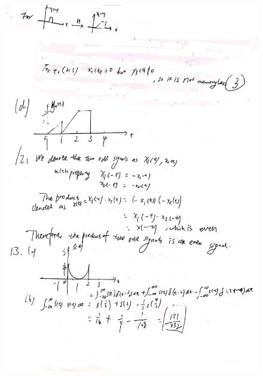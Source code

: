 \documentclass[a4paper]{article}
\begin{document}
\begin{figure}[H]
  \begin{center}
    \includegraphics[width=1\textwidth]{11(c)-13.jpg}
  \end{center}
\end{figure}
\end{document}
